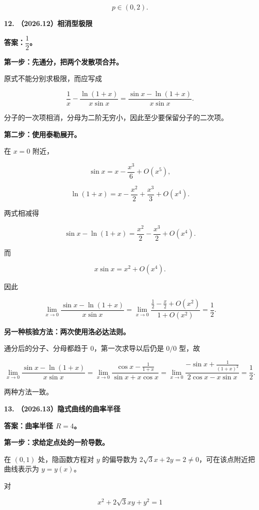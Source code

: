 \documentclass[UTF8,11pt,fontset=windows]{ctexart}
\begin{document}
$$
\boxed{p\in(0,2)}.
$$

\clearpage

\textbf{12. （2026.12）相消型极限}

\textbf{答案：$\dfrac12$。}

\textbf{第一步：先通分，把两个发散项合并。}

原式不能分别求极限，而应写成

$$
\frac1x-\frac{\ln(1+x)}{x\sin x}
=\frac{\sin x-\ln(1+x)}{x\sin x}.
$$

分子的一次项相消，分母为二阶无穷小，因此至少要保留分子的二次项。

\textbf{第二步：使用泰勒展开。}

在 $x=0$ 附近，

$$
\sin x=x-\frac{x^3}{6}+O(x^5),
$$

$$
\ln(1+x)=x-\frac{x^2}{2}+\frac{x^3}{3}+O(x^4).
$$

两式相减得

$$
\sin x-\ln(1+x)=\frac{x^2}{2}-\frac{x^3}{2}+O(x^4).
$$

而

$$
x\sin x=x^2+O(x^4).
$$

因此

$$
\lim_{x\to0}\frac{\sin x-\ln(1+x)}{x\sin x}
=\lim_{x\to0}\frac{\frac12-\frac{x}{2}+O(x^2)}{1+O(x^2)}
=\frac12.
$$

\textbf{另一种核验方法：两次使用洛必达法则。}

通分后的分子、分母都趋于 $0$，第一次求导以后仍是 $0/0$ 型，故

$$
\lim_{x\to0}\frac{\sin x-\ln(1+x)}{x\sin x}
=\lim_{x\to0}\frac{\cos x-\frac1{1+x}}{\sin x+x\cos x}
=\lim_{x\to0}\frac{-\sin x+\frac1{(1+x)^2}}{2\cos x-x\sin x}
=\frac12.
$$

两种方法一致。

\clearpage

\textbf{13. （2026.13）隐式曲线的曲率半径}

\textbf{答案：曲率半径 $R=4$。}

\textbf{第一步：求给定点处的一阶导数。}

在 $(0,1)$ 处，隐函数方程对 $y$ 的偏导数为 $2\sqrt3x+2y=2\ne0$，可在该点附近把曲线表示为 $y=y(x)$。

对

$$
x^2+2\sqrt3xy+y^2=1
$$
\end{document}
